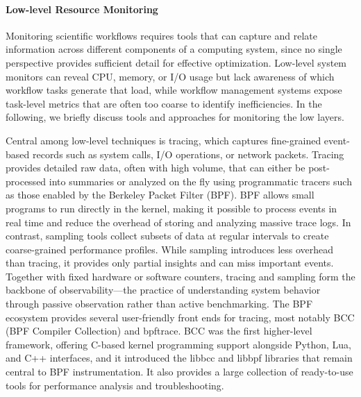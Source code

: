 \paragraph{Low-level Resource Monitoring}
Monitoring scientific workflows requires tools that can capture and relate information across different components of a computing system, since no single perspective provides sufficient detail for effective optimization. Low-level system monitors can reveal CPU, memory, or I/O usage but lack awareness of which workflow tasks generate that load, while workflow management systems expose task-level metrics that are often too coarse to identify inefficiencies. In the following, we briefly discuss tools and approaches for monitoring the low layers.

Central among low-level techniques is tracing, which captures fine-grained event-based records such as system calls, I/O operations, or network packets. Tracing provides detailed raw data, often with high volume, that can either be post-processed into summaries or analyzed on the fly using programmatic tracers such as those enabled by the Berkeley Packet Filter (BPF). BPF allows small programs to run directly in the kernel, making it possible to process events in real time and reduce the overhead of storing and analyzing massive trace logs. In contrast, sampling tools collect subsets of data at regular intervals to create coarse-grained performance profiles. While sampling introduces less overhead than tracing, it provides only partial insights and can miss important events. Together with fixed hardware or software counters, tracing and sampling form the backbone of observability—the practice of understanding system behavior through passive observation rather than active benchmarking.
The BPF ecosystem provides several user-friendly front ends for tracing, most notably BCC (BPF Compiler Collection) and bpftrace. BCC was the first higher-level framework, offering C-based kernel programming support alongside Python, Lua, and C++ interfaces, and it introduced the libbcc and libbpf libraries that remain central to BPF instrumentation. It also provides a large collection of ready-to-use tools for performance analysis and troubleshooting.

